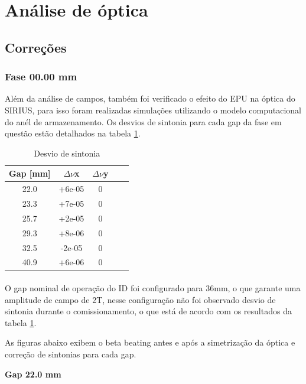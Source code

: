 \documentclass[a4paper,12pt]{article}
\begin{document}
\section{Análise de óptica}
\subsection{Correções}
\subsubsection{Fase 00.00 mm}

Além da análise de campos, também foi verificado o efeito do EPU na óptica do SIRIUS, para isso foram realizadas simulações utilizando o modelo computacional do anél de armazenamento. Os desvios de sintonia para cada gap da fase em questão estão detalhados na tabela \ref{tab:coropt0}.

\begin{table}[H]
\centering
\caption{Desvio de sintonia}
\begin{tabular}{|c|c|c|c|c|}
\hline
Gap {[}mm{]} & $\Delta \nu$x & $\Delta \nu$y\\ \hline
22.0 & +6e-05 & 0\\ \hline
23.3 & +7e-05 & 0\\ \hline
25.7 & +2e-05 & 0\\ \hline
29.3 & +8e-06 & 0\\ \hline
32.5 & -2e-05 & 0\\ \hline
40.9 & +6e-06 & 0\\ \hline
\end{tabular}
\label{tab:coropt0}
\end{table}

\paragraph{} O gap nominal de operação do ID foi configurado para 36mm, o que garante uma amplitude de campo de 2T, nesse configuração não foi observado desvio de sintonia durante o comissionamento, o que está de acordo com os resultados da tabela \ref{tab:coropt0}.

As figuras abaixo exibem o beta beating antes e após a simetrização da óptica e correção de sintonias para cada gap.

\textbf{Gap 22.0 mm} \\
\end{document}
